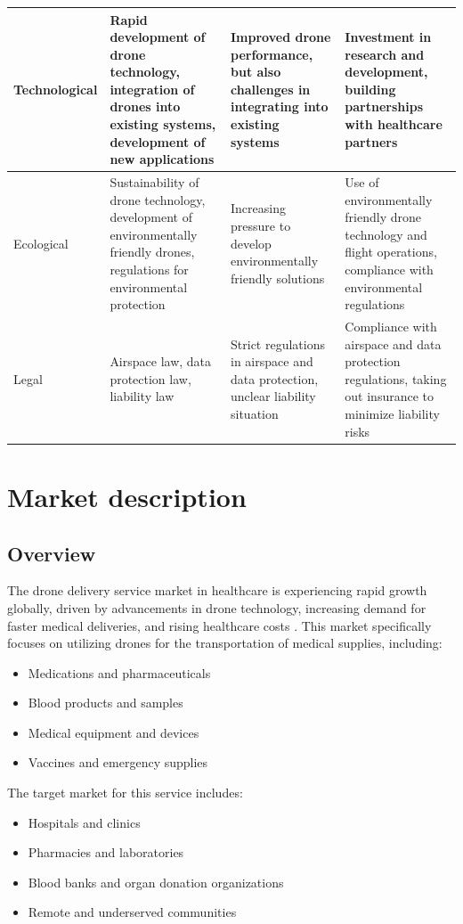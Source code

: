 \begin{longtable}{p{} p{} p{} p{}}
  Technological    & Rapid development of drone technology, integration of drones into existing systems, development of new applications          & Improved drone performance, but also challenges in integrating into existing systems               & Investment in research and development, building partnerships with healthcare partners                            \\ \hline

  Ecological       & Sustainability of drone technology, development of environmentally friendly drones, regulations for environmental protection & Increasing pressure to develop environmentally friendly solutions                                  & Use of environmentally friendly drone technology and flight operations, compliance with environmental regulations \\ \hline

  Legal            & Airspace law, data protection law, liability law                                                                             & Strict regulations in airspace and data protection, unclear liability situation                    & Compliance with airspace and data protection regulations, taking out insurance to minimize liability risks        \\ \hline
\end{longtable}
\section{Market description}
\subsection{Overview}
The drone delivery service market in healthcare is experiencing rapid growth globally, driven by advancements in drone technology, increasing demand for faster medical deliveries, and rising healthcare costs \cite{fortunebusinessinsights_2023_medical}. This market specifically focuses on utilizing drones for the transportation of medical supplies, including:
\begin{itemize}
  \item Medications and pharmaceuticals
  \item Blood products and samples
  \item Medical equipment and devices
  \item Vaccines and emergency supplies
\end{itemize}
The target market for this service includes:
\begin{itemize}
  \item Hospitals and clinics
  \item Pharmacies and laboratories
  \item Blood banks and organ donation organizations
  \item Remote and underserved communities
\end{itemize}
